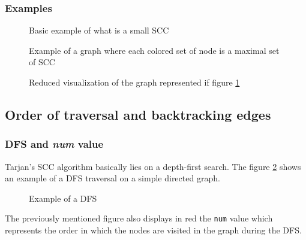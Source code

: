 \documentclass[a4 paper, 12pt]{article}
\theoremstyle{definition}
\begin{document}
\subsubsection{Examples}
\begin{figure}[!h]
    \centering
    \begin{subfigure}[t]{.49\textwidth}
    \end{subfigure}
    \begin{subfigure}[t]{.49\textwidth}
    \end{subfigure}
    \caption{Basic example of what is a small SCC}
\end{figure}
\begin{figure}[!h]
    \caption{Example of a graph where each colored set of node is a maximal set of SCC\label{fig:exampleSCC}}
\end{figure}

\begin{figure}[!h]
    \caption{Reduced visualization of the graph represented if figure \ref{fig:exampleSCC}}
\end{figure}

\subsection{Order of traversal and backtracking edges}
\subsubsection{DFS and \textit{num} value}
Tarjan's SCC algorithm basically lies on a depth-first search. The figure \ref{fig:dfs} shows an example of a DFS traversal on a simple directed graph.
\begin{figure}[!h]
    \caption{Example of a DFS\label{fig:dfs}}
\end{figure}

The previously mentioned figure also displays in red the \texttt{num} value which represents the order in which the nodes are visited in the graph during the DFS.
\end{document}
